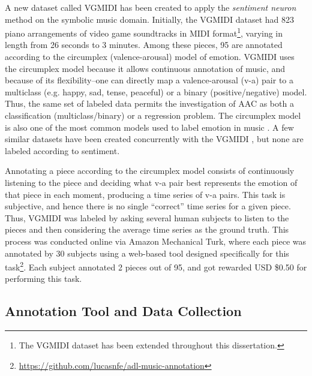A new dataset called VGMIDI has been created to apply the \textit{sentiment neuron} \cite{radford_2017} method on the symbolic music domain. Initially, the VGMIDI dataset had 823 piano arrangements of video game soundtracks in MIDI format\footnote{The VGMIDI dataset has been extended throughout this dissertation.}, varying in length from 26 seconds to 3 minutes.
Among these pieces, 95 are annotated according to the circumplex (valence-arousal) model of emotion. VGMIDI uses the circumplex model because it allows continuous annotation of music, and because of its flexibility--one can directly map a valence-arousal  (v-a) pair to a multiclass (e.g. happy, sad, tense, peaceful) or a binary (positive/negative) model. Thus, the same set of labeled data permits the investigation of AAC as both a classification (multiclass/binary) or a regression problem. The circumplex model is also one of the most common models used to label emotion in music \cite{Soleymani_2013}. A few similar datasets have been created concurrently with the VGMIDI \cite{madhok2018sentimozart, tan2020automated, zhao2019emotional}, but none are labeled according to sentiment.

Annotating a piece according to the circumplex model consists of continuously listening to the piece and deciding what v-a pair best represents the emotion of that piece in each moment, producing a time series of v-a pairs. This task is subjective, and hence there is no single ``correct'' time series for a given piece. Thus, VGMIDI was labeled by asking several human subjects to listen to the pieces and then considering the average time series as the ground truth. This process was conducted online via Amazon Mechanical Turk, where each piece was annotated by 30 subjects using a web-based tool designed specifically for this task\footnote{\url{https://github.com/lucasnfe/adl-music-annotation}}. Each subject annotated 2 pieces out of 95, and got rewarded USD \$0.50 for performing this task.

\subsection{Annotation Tool and Data Collection}
\label{sec:data_collection}

